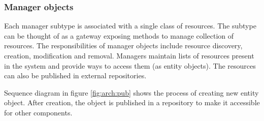 \documentclass[11pt,openany]{book}
\begin{document}
          \noindent
          \begin{minipage}{\textwidth}
            
          \end{minipage}


        \subsubsection{Manager objects}

          Each manager subtype is associated with a single class of resources. The subtype can be thought of as a
          gateway exposing methods to manage collection of resources. The responsibilities of manager objects include
          resource discovery, creation, modification and removal. Managers maintain lists of resources present in the
          system and provide ways to access them (as entity objects). The resources can also be published in external
          repositories. \\

          \noindent
          \begin{minipage}{\textwidth}
            
          \end{minipage}

          Sequence diagram in figure \ref{fig:arch:pub} shows the process of creating new entity object. After creation,
          the object is published in a repository to make it accessible for other components.
\end{document}
